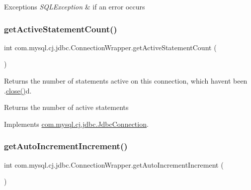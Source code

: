 \begin{DoxyExceptions}{Exceptions}
{\em S\+Q\+L\+Exception} & if an error occurs \\
\hline
\end{DoxyExceptions}
\mbox{\label{classcom_1_1mysql_1_1cj_1_1jdbc_1_1_connection_wrapper_ad356fedacaf160823158cc253f99322a}} 
\subsubsection{\texorpdfstring{get\+Active\+Statement\+Count()}{getActiveStatementCount()}}
{\footnotesize\ttfamily int com.\+mysql.\+cj.\+jdbc.\+Connection\+Wrapper.\+get\+Active\+Statement\+Count (\begin{DoxyParamCaption}{ }\end{DoxyParamCaption})}

Returns the number of statements active on this connection, which haven\textquotesingle{}t been .\mbox{\hyperlink{classcom_1_1mysql_1_1cj_1_1jdbc_1_1_connection_wrapper_a1513ad5e208ca46ac61ab5359590a0b9}{close()}}d.

\begin{DoxyReturn}{Returns}
the number of active statements 
\end{DoxyReturn}


Implements \mbox{\hyperlink{interfacecom_1_1mysql_1_1cj_1_1jdbc_1_1_jdbc_connection_aea218879f6bae7ed7717a257876582db}{com.\+mysql.\+cj.\+jdbc.\+Jdbc\+Connection}}.

\mbox{\label{classcom_1_1mysql_1_1cj_1_1jdbc_1_1_connection_wrapper_a0855a0981bb14e92fee22c3591d95175}} 
\subsubsection{\texorpdfstring{get\+Auto\+Increment\+Increment()}{getAutoIncrementIncrement()}}
{\footnotesize\ttfamily int com.\+mysql.\+cj.\+jdbc.\+Connection\+Wrapper.\+get\+Auto\+Increment\+Increment (\begin{DoxyParamCaption}{ }\end{DoxyParamCaption})}

